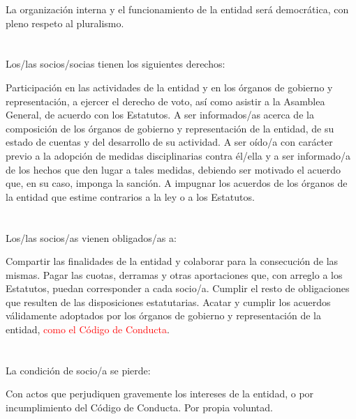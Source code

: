 \documentclass[draft]{estatutos}
\begin{document}
\begin{linenumbers}[1]
  La organización interna y el funcionamiento de la entidad será democrática,
  con pleno respeto al pluralismo.

  \section{}
  Los/las socios/socias tienen los siguientes derechos:

  \begin{enumerate}
  \sub Participación en las actividades de la entidad y en los órganos de
  gobierno y representación, a ejercer el derecho de voto, así como asistir a
  la Asamblea General, de acuerdo con los Estatutos.
  \sub A ser informados/as acerca de la composición de los órganos de gobierno
  y representación de la entidad, de su estado de cuentas y del desarrollo de
  su actividad.
  \sub A ser oído/a con carácter previo a la adopción de medidas disciplinarias
  contra él/ella y a ser informado/a de los hechos que den lugar a tales
  medidas, debiendo ser motivado el acuerdo que, en su caso, imponga la
  sanción.
  \sub A impugnar los acuerdos de los órganos de la entidad que estime
  contrarios a la ley o a los Estatutos.
  \end{enumerate}

  \section{}
  Los/las socios/as vienen obligados/as a:

  \begin{enumerate}
  \sub Compartir las finalidades de la entidad y colaborar para la consecución
      de las mismas.
  \sub Pagar las cuotas, derramas y otras aportaciones que, con arreglo a los
      Estatutos, puedan corresponder a cada socio/a.
  \sub Cumplir el resto de obligaciones que resulten de las disposiciones
      estatutarias.
  \sub Acatar y cumplir los acuerdos válidamente adoptados por los órganos de
      gobierno y representación de la entidad, \textcolor{red}{como el Código de Conducta}.
  \end{enumerate}

  \section{}
  La condición de socio/a se pierde:

  \begin{enumerate}
  \sub Con actos que perjudiquen gravemente los intereses de la entidad, o por
      incumplimiento del Código de Conducta.
  \sub Por propia voluntad.
  \end{enumerate}
 

\end{linenumbers}
\end{document}
